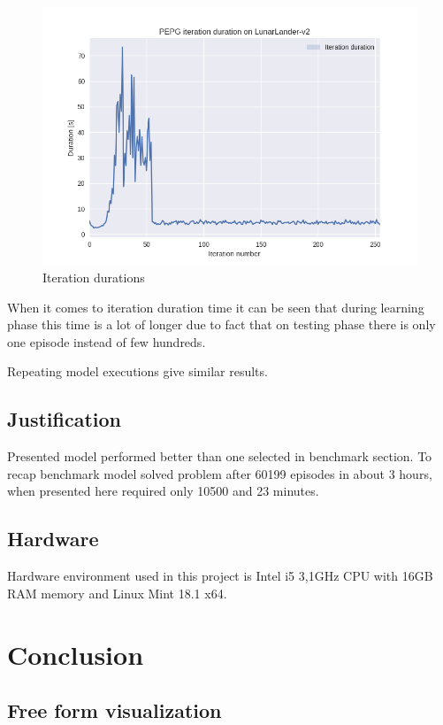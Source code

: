 \documentclass[12pt]{article}
\begin{document}
\begin{figure}[!h]
\centering
\includegraphics[scale=0.9]{final_plot_duration.png} 
\caption{Iteration durations}
\end{figure}

When it comes to iteration duration time it can be seen that during learning phase this time is a lot of longer due to fact that on testing phase there is only one episode instead of few hundreds.

Repeating model executions give similar results.

\subsection{Justification}

Presented model performed better than one selected in benchmark section. To recap benchmark model solved problem after 60199 episodes in about 3 hours, when presented here required only 10500 and 23 minutes.

\subsection{Hardware}
Hardware environment used in this project is Intel i5 3,1GHz CPU with 16GB RAM memory and Linux Mint 18.1 x64.

\section{Conclusion}

\subsection{Free form visualization}
\end{document}
